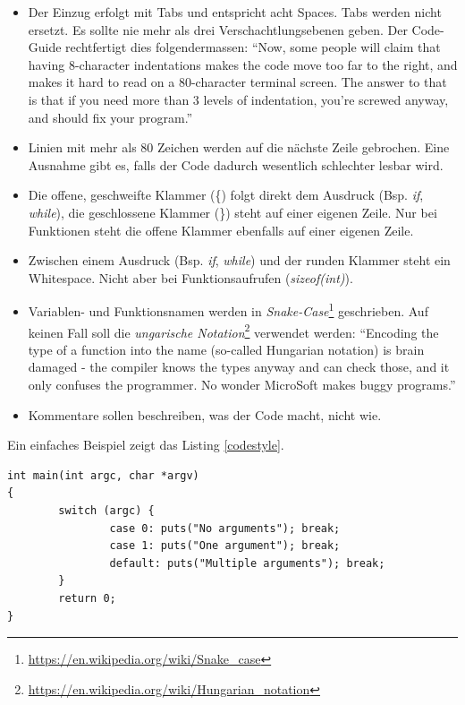 \begin{itemize}
   \item Der Einzug erfolgt mit Tabs und entspricht acht Spaces. Tabs werden nicht ersetzt.
         Es sollte nie mehr als drei Verschachtlungsebenen geben. Der Code-Guide rechtfertigt dies folgendermassen:
         \enquote{Now, some people will claim that having 8-character indentations makes
            the code move too far to the right, and makes it hard to read on a
            80-character terminal screen.  The answer to that is that if you need
            more than 3 levels of indentation, you're screwed anyway, and should fix
            your program.}

   \item Linien mit mehr als 80 Zeichen werden auf die nächste Zeile gebrochen. Eine Ausnahme gibt es,
         falls der Code dadurch wesentlich schlechter lesbar wird.

   \item Die offene, geschweifte Klammer (\{) folgt direkt dem Ausdruck (Bsp. \emph{if}, \emph{while}), die geschlossene Klammer (\}) steht 
         auf einer eigenen Zeile. Nur bei Funktionen steht die offene Klammer ebenfalls auf einer eigenen Zeile.

   \item Zwischen einem Ausdruck (Bsp. \emph{if}, \emph{while}) und der runden Klammer steht ein Whitespace. Nicht aber bei Funktionsaufrufen (\emph{sizeof(int)}).

   \item Variablen- und Funktionsnamen werden in \emph{Snake-Case}\footnote{\url{https://en.wikipedia.org/wiki/Snake_case}} geschrieben.
         Auf keinen Fall soll die \emph{ungarische Notation}\footnote{\url{https://en.wikipedia.org/wiki/Hungarian_notation}} verwendet werden:
         \enquote{Encoding the type of a function into the name (so-called Hungarian
            notation) is brain damaged - the compiler knows the types anyway and can
            check those, and it only confuses the programmer.  No wonder MicroSoft
            makes buggy programs.}

   \item Kommentare sollen beschreiben, was der Code macht, nicht wie.
\end{itemize}

Ein einfaches Beispiel zeigt das Listing \ref{codestyle}.
\begin{lstlisting}[label=codestyle,caption=Formatierung des Linux-Kernels]
int main(int argc, char *argv)
{
        switch (argc) {
                case 0: puts("No arguments"); break;
                case 1: puts("One argument"); break;
                default: puts("Multiple arguments"); break;
        }
        return 0;
}
\end{lstlisting}



